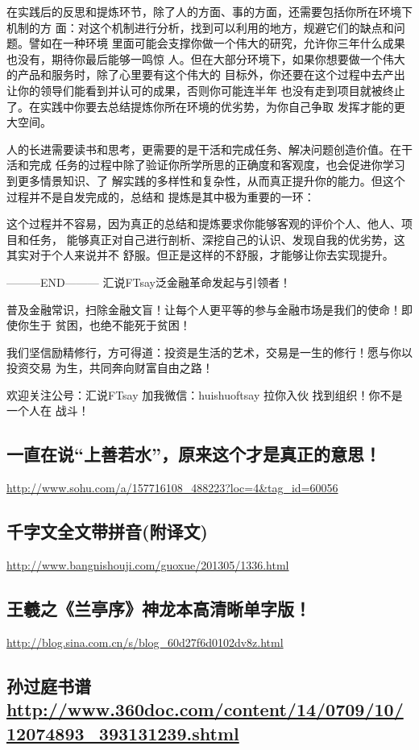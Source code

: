 \documentclass[11pt]{ctexart}
\begin{document}
{{{{在实践后的反思和提炼环节，除了人的方面、事的方面，还需要包括你所在环境下机制的方
面：对这个机制进行分析，找到可以利用的地方，规避它们的缺点和问题。譬如在一种环境
里面可能会支撑你做一个伟大的研究，允许你三年什么成果也没有，期待你最后能够一鸣惊
人。但在大部分环境下，如果你想要做一个伟大的产品和服务时，除了心里要有这个伟大的
目标外，你还要在这个过程中去产出让你的领导们能看到并认可的成果，否则你可能连半年
也没有走到项目就被终止了。在实践中你要去总结提炼你所在环境的优劣势，为你自己争取
发挥才能的更大空间。

人的长进需要读书和思考，更需要的是干活和完成任务、解决问题创造价值。在干活和完成
任务的过程中除了验证你所学所思的正确度和客观度，也会促进你学习到更多情景知识、了
解实践的多样性和复杂性，从而真正提升你的能力。但这个过程并不是自发完成的，总结和
提炼是其中极为重要的一环：

这个过程并不容易，因为真正的总结和提炼要求你能够客观的评价个人、他人、项目和任务，
能够真正对自己进行剖析、深挖自己的认识、发现自我的优劣势，这其实对于个人来说并不
舒服。但正是这样的不舒服，才能够让你去实现提升。

---------END---------
汇说FTsay泛金融革命发起与引领者！

普及金融常识，扫除金融文盲！让每个人更平等的参与金融市场是我们的使命！即使你生于
贫困，也绝不能死于贫困！

我们坚信励精修行，方可得道：投资是生活的艺术，交易是一生的修行！愿与你以投资交易
为生，共同奔向财富自由之路！

欢迎关注公号：汇说FTsay 加我微信：huishuoftsay 拉你入伙 找到组织！你不是一个人在
战斗！


\subsection{一直在说“上善若水”，原来这个才是真正的意思！}
\label{sec:org615c883}
\url{http://www.sohu.com/a/157716108\_488223?loc=4\&tag\_id=60056}
\subsection{千字文全文带拼音(附译文)}
\label{sec:org613e8a3}
\url{http://www.bangnishouji.com/guoxue/201305/1336.html}
\subsection{王羲之《兰亭序》神龙本高清晰单字版！}
\label{sec:org14fa5a4}
\url{http://blog.sina.com.cn/s/blog\_60d27f6d0102dv8z.html}
\subsection{孙过庭书谱 \url{http://www.360doc.com/content/14/0709/10/12074893\_393131239.shtml}}
\label{sec:org4d15beb}
}}}}
\end{document}
